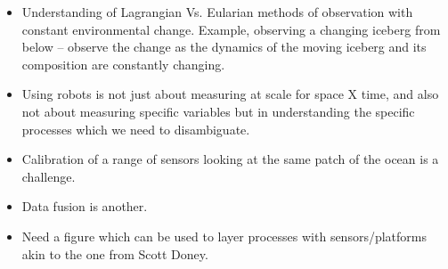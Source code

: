 \begin{itemize}[noitemsep,topsep=0pt,parsep=0pt,partopsep=0pt]
\item Understanding of Lagrangian Vs. Eularian methods of
  observation with constant environmental change. Example, observing a
  changing iceberg from below -- observe the change as the dynamics of
  the moving iceberg and its composition are constantly changing.

\item Using robots is not just about measuring at scale for space X
  time, and also not about measuring specific variables but in
  understanding the specific processes which we need to disambiguate.

\item Calibration of a range of sensors looking at the same patch of the
  ocean is a challenge.

\item Data fusion is another.

\item Need a figure which can be used to layer processes with
  sensors/platforms akin to the one from Scott Doney.

\end{itemize}